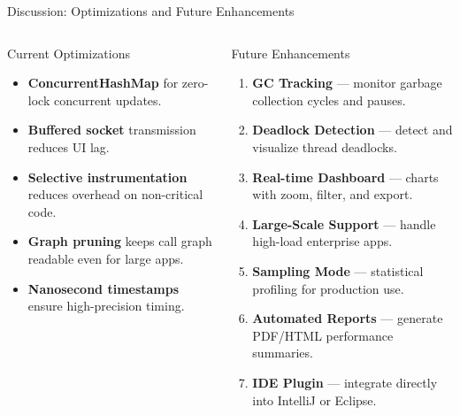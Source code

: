 \documentclass[aspectratio=169]{beamer}
\begin{document}
\begin{frame}{Discussion: Optimizations and Future Enhancements}
  \begin{columns}[T]
      \begin{block}{Current Optimizations}
        \begin{itemize}\small\itemsep3pt
          \item \textbf{ConcurrentHashMap} for zero-lock concurrent updates.
          \item \textbf{Buffered socket} transmission reduces UI lag.
          \item \textbf{Selective instrumentation} reduces overhead on non-critical code.
          \item \textbf{Graph pruning} keeps call graph readable even for large apps.
          \item \textbf{Nanosecond timestamps} ensure high-precision timing.
        \end{itemize}
      \end{block}
      \begin{block}{Future Enhancements}
        \begin{enumerate}\small\itemsep3pt
          \item \textbf{GC Tracking} — monitor garbage collection cycles and pauses.
          \item \textbf{Deadlock Detection} — detect and visualize thread deadlocks.
          \item \textbf{Real-time Dashboard} — charts with zoom, filter, and export.
          \item \textbf{Large-Scale Support} — handle high-load enterprise apps.
          \item \textbf{Sampling Mode} — statistical profiling for production use.
          \item \textbf{Automated Reports} — generate PDF/HTML performance summaries.
          \item \textbf{IDE Plugin} — integrate directly into IntelliJ or Eclipse.
        \end{enumerate}
      \end{block}
  \end{columns}
\end{frame}

\end{document}
